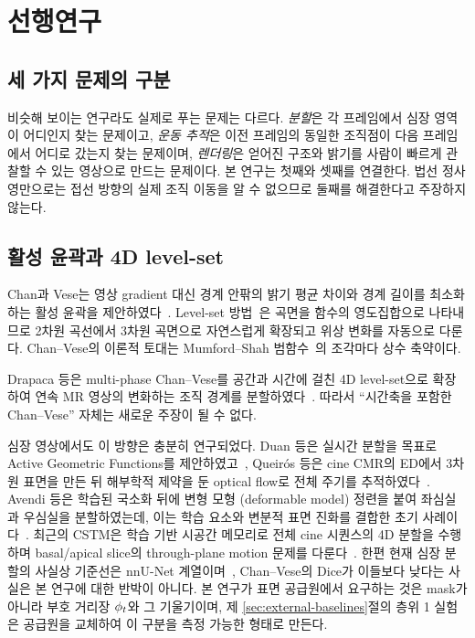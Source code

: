 \chapter{선행연구}
\label{ch:related}

\section{세 가지 문제의 구분}

비슷해 보이는 연구라도 실제로 푸는 문제는 다르다. \emph{분할}은 각 프레임에서
심장 영역이 어디인지 찾는 문제이고, \emph{운동 추적}은 이전 프레임의 동일한
조직점이 다음 프레임에서 어디로 갔는지 찾는 문제이며, \emph{렌더링}은 얻어진
구조와 밝기를 사람이 빠르게 관찰할 수 있는 영상으로 만드는 문제이다. 본 연구는
첫째와 셋째를 연결한다. 법선 정사영만으로는 접선 방향의 실제 조직 이동을 알 수
없으므로 둘째를 해결한다고 주장하지 않는다.

\section{활성 윤곽과 4D level-set}

Chan과 Vese는 영상 gradient 대신 경계 안팎의 밝기 평균 차이와 경계 길이를
최소화하는 활성 윤곽을 제안하였다~\citep{chan2001_active}. Level-set
방법~\citep{osher1988_fronts}은 곡면을 함수의 영도집합으로 나타내므로 2차원
곡선에서 3차원 곡면으로 자연스럽게 확장되고 위상 변화를 자동으로 다룬다.
Chan--Vese의 이론적 토대는 Mumford--Shah 범함수~\citep{mumford1989_optimal}의
조각마다 상수 축약이다.

Drapaca 등은 multi-phase Chan--Vese를 공간과 시간에 걸친 4D level-set으로 확장하여
연속 MR 영상의 변화하는 조직 경계를 분할하였다~\citep{drapaca2005_segmentation}.
따라서 ``시간축을 포함한 Chan--Vese'' 자체는 새로운 주장이 될 수 없다.

심장 영상에서도 이 방향은 충분히 연구되었다. Duan 등은 실시간 분할을 목표로 Active
Geometric Functions를 제안하였고~\citep{duan2010_realtime}, Queir\'os 등은 cine CMR의
ED에서 3차원 표면을 만든 뒤 해부학적 제약을 둔 optical flow로 전체 주기를
추적하였다~\citep{queiros2014_fast}. Avendi 등은 학습된 국소화 뒤에 변형 모형
(deformable model) 정련을 붙여 좌심실과 우심실을 분할하였는데, 이는 학습 요소와
변분적 표면 진화를 결합한 초기 사례이다~\citep{avendi2016_combined,avendi2017_rv}.
최근의 CSTM은 학습 기반 시공간 메모리로 전체 cine 시퀀스의 4D 분할을 수행하며
basal/apical slice의 through-plane motion 문제를 다룬다~\citep{ye2025_cstm}. 한편
현재 심장 분할의 사실상 기준선은 nnU-Net 계열이며~\citep{isensee2021_nnunet},
Chan--Vese의 Dice가 이들보다 낮다는 사실은 본 연구에 대한 반박이 아니다. 본 연구가
표면 공급원에서 요구하는 것은 mask가 아니라 부호 거리장 $\phi_t$와 그 기울기이며,
제 \ref{sec:external-baselines}절의 층위 1 실험은 공급원을 교체하여 이 구분을
측정 가능한 형태로 만든다.

